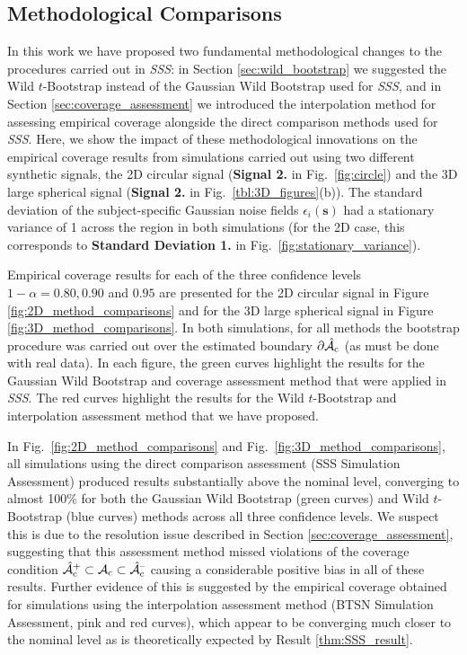 \subsection{Methodological Comparisons}
\label{sec:method_comparisons}
In this work we have proposed two fundamental methodological changes to the procedures carried out in \textit{SSS}: in Section \ref{sec:wild_bootstrap} we suggested the Wild $t$-Bootstrap instead of the Gaussian Wild Bootstrap used for \textit{SSS}, and in Section \ref{sec:coverage_assessment} we introduced the interpolation method for assessing empirical coverage alongside the direct comparison methods used for \textit{SSS}. Here, we show the impact of these methodological innovations on the empirical coverage results from simulations carried out using two different synthetic signals, the 2D circular signal (\textbf{Signal 2.} in Fig.\ \ref{fig:circle}) and the 3D large spherical signal (\textbf{Signal 2.} in Fig.\ \ref{tbl:3D_figures}(b)). The standard deviation of the subject-specific Gaussian noise fields $\epsilon_i(\bm{s})$ had a stationary variance of 1 across the region in both simulations (for the 2D case, this corresponds to \textbf{Standard Deviation 1.} in Fig.\ \ref{fig:stationary_variance}).

Empirical coverage results for each of the three confidence levels $1 - \alpha = 0.80, 0.90$ and $0.95$ are presented for the 2D circular signal in Figure \ref{fig:2D_method_comparisons} and for the 3D large spherical signal in Figure \ref{fig:3D_method_comparisons}. In both simulations, for all methods the bootstrap procedure was carried out over the estimated boundary $\operatorname{\partial\hat{\mathcal{A}}_{c}}$ (as must be done with real data). In each figure, the green curves highlight the results for the Gaussian Wild Bootstrap and coverage assessment method that were applied in \textit{SSS}. The red curves highlight the results for the Wild $t$-Bootstrap and interpolation assessment method that we have proposed.  

In Fig.\ \ref{fig:2D_method_comparisons} and Fig.\ \ref{fig:3D_method_comparisons}, all simulations using the direct comparison assessment (SSS Simulation Assessment) produced results substantially above the nominal level, converging to almost 100\% for both the Gaussian Wild Bootstrap (green curves) and Wild $t$-Bootstrap (blue curves) methods across all three confidence levels. We suspect this is due to the resolution issue described in Section \ref{sec:coverage_assessment}, suggesting that this assessment method missed violations of the coverage condition $\operatorname{\hat{\mathcal{A}}_{c}^+} \subset \operatorname{\mathcal{A}_{c}} \subset \operatorname{\hat{\mathcal{A}}_{c}^{\textrm{--}}}$ causing a considerable positive bias in all of these results. Further evidence of this is suggested by the empirical coverage obtained for simulations using the interpolation assessment method (BTSN Simulation Assessment, pink and red curves), which appear to be converging much closer to the nominal level as is theoretically expected by Result \ref{thm:SSS_result}.

